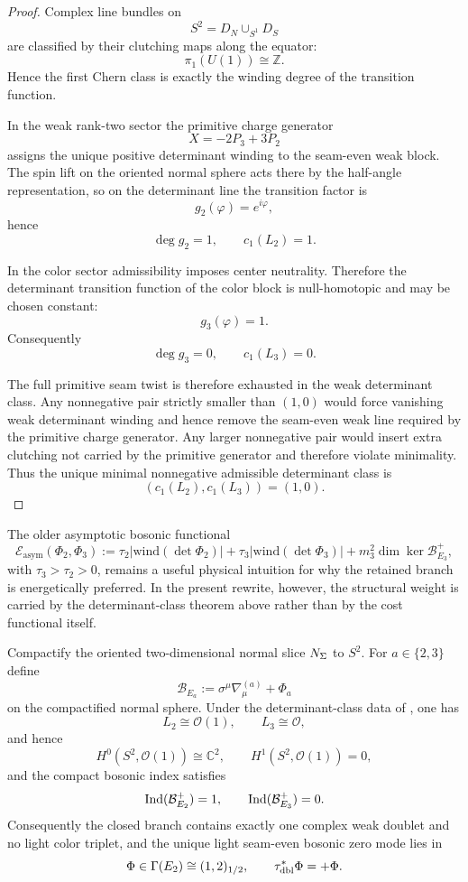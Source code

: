 \begin{proof}
Complex line bundles on
\[
S^2=D_N\cup_{S^1}D_S
\]
are classified by their clutching maps along the equator:
\[
\pi_1(U(1))\cong \mathbb Z.
\]
Hence the first Chern class is exactly the winding degree of the transition function.

In the weak rank-two sector the primitive charge generator
\[
X=-2P_3+3P_2
\]
assigns the unique positive determinant winding to the seam-even weak block. The spin lift on the
oriented normal sphere acts there by the half-angle representation, so on the determinant line the
transition factor is
\[
g_2(\varphi)=e^{i\varphi},
\]
hence
\[
\deg g_2=1,
\qquad
c_1(L_2)=1.
\]

In the color sector admissibility imposes center neutrality. Therefore the determinant transition
function of the color block is null-homotopic and may be chosen constant:
\[
g_3(\varphi)=1.
\]
Consequently
\[
\deg g_3=0,
\qquad
c_1(L_3)=0.
\]

The full primitive seam twist is therefore exhausted in the weak determinant class. Any nonnegative
pair strictly smaller than $(1,0)$ would force vanishing weak determinant winding and hence remove
the seam-even weak line required by the primitive charge generator. Any larger nonnegative pair
would insert extra clutching not carried by the primitive generator and therefore violate
minimality. Thus the unique minimal nonnegative admissible determinant class is
\[
(c_1(L_2),c_1(L_3))=(1,0).
\]
\end{proof}

\begin{remark}
The older asymptotic bosonic functional
\[
\mathcal E_{\mathrm{asym}}(\Phi_2,\Phi_3)
:=
\tau_2\bigl|\mathrm{wind}(\det\Phi_2)\bigr|
+\tau_3\bigl|\mathrm{wind}(\det\Phi_3)\bigr|
+m_3^2\dim\ker\mathcal B_{E_3}^+,
\]
with $\tau_3>\tau_2>0$, remains a useful physical intuition for why the retained branch is energetically preferred. In the present rewrite, however, the structural weight is carried by the determinant-class theorem above rather than by the cost functional itself.
\end{remark}

\begin{theorem}
\label{thm:callias-higgs-selection}
\label{thm:compact-higgs-unique}
\label{thm:compact-determinant-higgs-index}
Compactify the oriented two-dimensional normal slice $N_\Sigma$ to $S^2$. For $a\in\{2,3\}$
define
\[
\mathcal B_{E_a}:=\sigma^\mu\nabla^{(a)}_\mu+\Phi_a
\]
on the compactified normal sphere. Under the determinant-class data of
, one has
\[
L_2\cong\mathcal O(1),
\qquad
L_3\cong\mathcal O,
\]
and hence
\[
H^0(S^2,\mathcal O(1))\cong\mathbb C^2,
\qquad
H^1(S^2,\mathcal O(1))=0,
\]
and the compact bosonic index satisfies
\[
\operatorname{Ind}(\mathcal B_{E_2}^+)=1,
\qquad
\operatorname{Ind}(\mathcal B_{E_3}^+)=0.
\]
Consequently the closed branch contains exactly one complex weak doublet and no light color triplet,
and the unique light seam-even bosonic zero mode lies in
\[
\Phi\in\Gamma(E_2)\cong (1,2)_{1/2},
\qquad
\tau_{\mathrm{dbl}}^{\ast}\Phi=+\Phi.
\]
\end{theorem}

